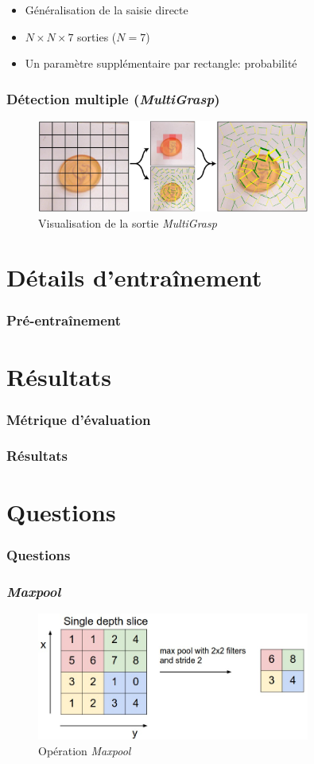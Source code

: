 \documentclass{beamer}
\begin{document}
\begin{frame}
  \begin{itemize}
  \item Généralisation de la saisie directe
  \item $N \times N \times 7$ sorties ($N = 7$)
  \item Un paramètre supplémentaire par rectangle: probabilité
  \end{itemize}
  \frametitle{Détection multiple (\emph{MultiGrasp})}
  \begin{figure}
    \centering
    \includegraphics[width=0.8\textwidth]{img/multigrasp.png}
    \caption{Visualisation de la sortie \emph{MultiGrasp}}
    \label{fig:multigrasp}
  \end{figure}
\end{frame}

\section{Détails d'entraînement}
\begin{frame}
  \frametitle{Pré-entraînement}
  
\end{frame}

\section{Résultats}
\begin{frame}
  \frametitle{Métrique d'évaluation}
  
\end{frame}

\begin{frame}
  \frametitle{Résultats}
  
\end{frame}

\section{Questions}
\begin{frame}
  \frametitle{Questions}
  
\end{frame}

\begin{frame}
  \frametitle{\emph{Maxpool}}
  \begin{figure}
    \centering
    \includegraphics[width=0.8\textwidth]{img/maxpool.jpeg}
    \caption{Opération \emph{Maxpool}}
    \label{fig:maxpool}
  \end{figure}
\end{frame}
\end{document}
